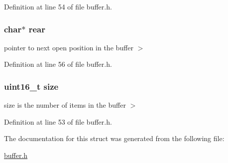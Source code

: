 Definition at line 54 of file buffer.\+h.

\hypertarget{structbuffer__t_a96c6c547bf6a43ef40eeca3198cce36e}{}
\subsubsection[{rear}]{\setlength{\rightskip}{0pt plus 5cm}char$\ast$ rear}\label{structbuffer__t_a96c6c547bf6a43ef40eeca3198cce36e}
pointer to next open position in the buffer $>$ 

Definition at line 56 of file buffer.\+h.

\hypertarget{structbuffer__t_aaba88b24a21a6c70c895c0d55f4a69a0}{}
\subsubsection[{size}]{\setlength{\rightskip}{0pt plus 5cm}uint16\+\_\+t size}\label{structbuffer__t_aaba88b24a21a6c70c895c0d55f4a69a0}
size is the number of items in the buffer $>$ 

Definition at line 53 of file buffer.\+h.



The documentation for this struct was generated from the following file\+:\begin{DoxyCompactItemize}
\item 
\hyperlink{buffer_8h}{buffer.\+h}\end{DoxyCompactItemize}
